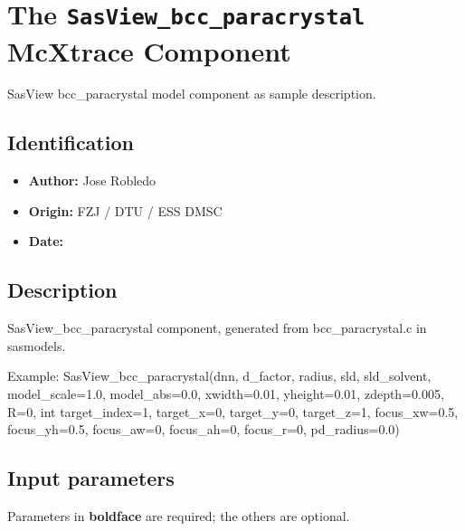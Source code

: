 \section{The \texttt{SasView\_bcc\_paracrystal} McXtrace Component}
SasView bcc\_paracrystal model component as sample description.

\subsection*{Identification}
\begin{itemize}
  \item \textbf{Author:} Jose Robledo
  \item \textbf{Origin:} FZJ / DTU / ESS DMSC
  \item \textbf{Date:} 
\end{itemize}

\subsection*{Description}
SasView\_bcc\_paracrystal component, generated from bcc\_paracrystal.c in sasmodels.

Example: SasView\_bcc\_paracrystal(dnn, d\_factor, radius, sld, sld\_solvent, model\_scale=1.0, model\_abs=0.0, xwidth=0.01, yheight=0.01, zdepth=0.005, R=0, int target\_index=1, target\_x=0, target\_y=0, target\_z=1, focus\_xw=0.5, focus\_yh=0.5, focus\_aw=0, focus\_ah=0, focus\_r=0, pd\_radius=0.0)

\subsection*{Input parameters}
Parameters in \textbf{boldface} are required; the others are optional.

